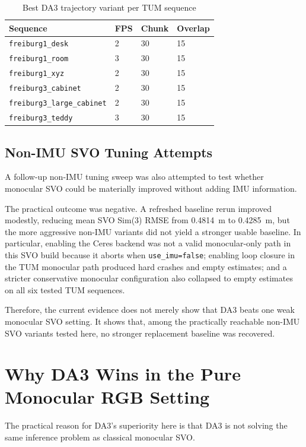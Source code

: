 \documentclass[conference]{IEEEtran}
\begin{document}
\begin{table}[t]
\caption{Best DA3 trajectory variant per TUM sequence}
\label{tab:da3best}
\centering
\small
\begin{tabular}{llll}
\toprule
Sequence & FPS & Chunk & Overlap \\
\midrule
\texttt{freiburg1\_desk} & 2 & 30 & 15 \\
\texttt{freiburg1\_room} & 3 & 30 & 15 \\
\texttt{freiburg1\_xyz} & 2 & 30 & 15 \\
\texttt{freiburg3\_cabinet} & 2 & 30 & 15 \\
\texttt{freiburg3\_large\_cabinet} & 2 & 30 & 15 \\
\texttt{freiburg3\_teddy} & 3 & 30 & 15 \\
\bottomrule
\end{tabular}
\end{table}

\subsection{Non-IMU SVO Tuning Attempts}
A follow-up non-IMU tuning sweep was also attempted to test whether monocular SVO could be materially improved without adding IMU information.

The practical outcome was negative. A refreshed baseline rerun improved modestly, reducing mean SVO Sim(3) RMSE from 0.4814~m to 0.4285~m, but the more aggressive non-IMU variants did not yield a stronger usable baseline. In particular, enabling the Ceres backend was not a valid monocular-only path in this SVO build because it aborts when \texttt{use\_imu=false}; enabling loop closure in the TUM monocular path produced hard crashes and empty estimates; and a stricter conservative monocular configuration also collapsed to empty estimates on all six tested TUM sequences.

Therefore, the current evidence does not merely show that DA3 beats one weak monocular SVO setting. It shows that, among the practically reachable non-IMU SVO variants tested here, no stronger replacement baseline was recovered.

\section{Why DA3 Wins in the Pure Monocular RGB Setting}
The practical reason for DA3's superiority here is that DA3 is not solving the same inference problem as classical monocular SVO.
\end{document}

